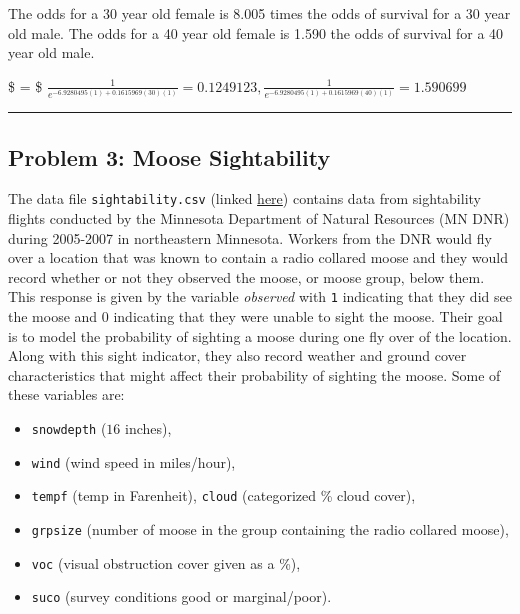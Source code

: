 \documentclass[
]{article}
\providecommand{\tightlist}{%
  \setlength{\itemsep}{0pt}\setlength{\parskip}{0pt}}
\begin{document}
The odds for a 30 year old female is 8.005 times the odds of survival
for a 30 year old male. The odds for a 40 year old female is 1.590 the
odds of survival for a 40 year old male.

\$
= \$ \newline
\(\frac{1}{e^{-6.9280495(1) + 0.1615969(30)(1)}} = 0.1249123, \frac{1}{e^{-6.9280495(1) + 0.1615969(40)(1)}} = 1.590699\)

\begin{center}\rule{0.5\linewidth}{0.5pt}\end{center}

\hypertarget{problem-3-moose-sightability}{%
\subsection{Problem 3: Moose
Sightability}\label{problem-3-moose-sightability}}

The data file \texttt{sightability.csv} (linked
\href{http://people.carleton.edu/~kstclair/data/sightability.csv}{here})
contains data from sightability flights conducted by the Minnesota
Department of Natural Resources (MN DNR) during 2005-2007 in
northeastern Minnesota. Workers from the DNR would fly over a location
that was known to contain a radio collared moose and they would record
whether or not they observed the moose, or moose group, below them. This
response is given by the variable \emph{observed} with \texttt{1}
indicating that they did see the moose and 0 indicating that they were
unable to sight the moose. Their goal is to model the probability of
sighting a moose during one fly over of the location. Along with this
sight indicator, they also record weather and ground cover
characteristics that might affect their probability of sighting the
moose. Some of these variables are:

\begin{itemize}
\tightlist
\item
  \texttt{snowdepth} (\(<8, 8-16, >16\) inches),
\item
  \texttt{wind} (wind speed in miles/hour),
\item
  \texttt{tempf} (temp in Farenheit), \texttt{cloud} (categorized \%
  cloud cover),
\item
  \texttt{grpsize} (number of moose in the group containing the radio
  collared moose),
\item
  \texttt{voc} (visual obstruction cover given as a \%),
\item
  \texttt{suco} (survey conditions good or marginal/poor).
\end{itemize}
\end{document}
